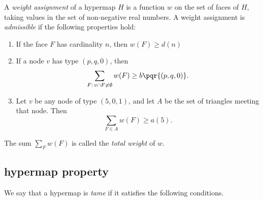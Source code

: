 \begin{definition}
%
A {\it weight assignment\/} of a hypermap $H$ is a function $w$ on
the set of faces of $H$, taking values in the set of non-negative
real numbers. A weight assignment is {\it admissible} if the
following properties hold:
%
\begin{enumerate}
  \item If the face $F$ has cardinality $n$, then
        $w(F) \ge d(n)$
  \item If a node $v$ has type $(p,q,0)$, then
        $$\sum_{F:\,v\cap F\ne\emptyset} w(F) \ge b{\pqr{(p,q,0)}}.$$
        \label{admissible:b}
  \item Let $v$ be any node of type $(5,0,1)$, and let $A$ be the set of
triangles meeting that node.
        Then
        $$\sum_{F\in A} w(F)
            \ge  a(5).$$
        \label{definition:admissible:excess}
\end{enumerate}
The sum $\sum_F w(F)$ is called the {\it total weight} of $w$.
\end{definition}





\subsection{hypermap property}
\label{sec:graphproperty}

We say that a hypermap is {\it tame\/} if it satisfies the following
conditions.
%

